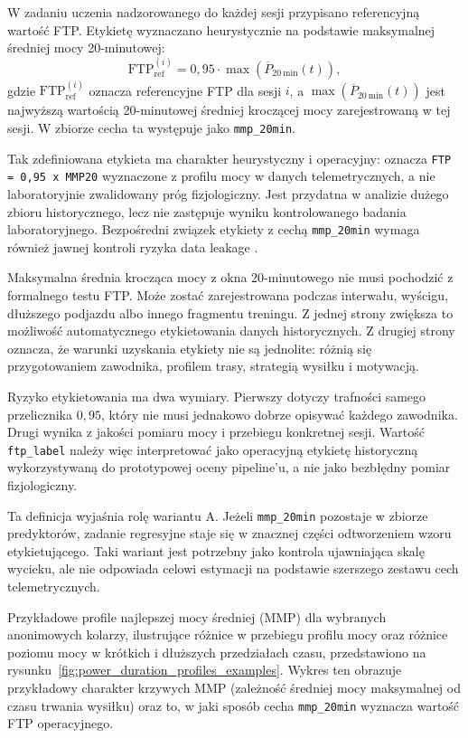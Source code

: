 W zadaniu uczenia nadzorowanego do każdej sesji przypisano referencyjną wartość FTP. Etykietę wyznaczano heurystycznie na podstawie maksymalnej średniej mocy 20-minutowej:
\begin{equation}
\label{eq:ftp_ref_mmp20_metodologia}
\mathrm{FTP}_{\mathrm{ref}}^{(i)} = 0{,}95 \cdot \max\!\left(\overline{P}_{20\ \mathrm{min}}(t)\right),
\end{equation}
gdzie $\mathrm{FTP}_{\mathrm{ref}}^{(i)}$ oznacza referencyjne FTP dla sesji $i$, a $\max(\overline{P}_{20\ \mathrm{min}}(t))$ jest najwyższą wartością 20-minutowej średniej kroczącej mocy zarejestrowaną w tej sesji. W zbiorze cecha ta występuje jako \texttt{mmp\_20min}.

Tak zdefiniowana etykieta ma charakter heurystyczny i operacyjny: oznacza \texttt{FTP = 0{,}95 x MMP20} wyznaczone z profilu mocy w danych telemetrycznych, a nie laboratoryjnie zwalidowany próg fizjologiczny. Jest przydatna w analizie dużego zbioru historycznego, lecz nie zastępuje wyniku kontrolowanego badania laboratoryjnego. Bezpośredni związek etykiety z cechą \texttt{mmp\_20min} wymaga również jawnej kontroli ryzyka data leakage \parencite{kaufman2012leakage,bernett2024leakage}.

Maksymalna średnia krocząca mocy z okna 20-minutowego nie musi pochodzić z formalnego testu FTP. Może zostać zarejestrowana podczas interwału, wyścigu, dłuższego podjazdu albo innego fragmentu treningu. Z jednej strony zwiększa to możliwość automatycznego etykietowania danych historycznych. Z drugiej strony oznacza, że warunki uzyskania etykiety nie są jednolite: różnią się przygotowaniem zawodnika, profilem trasy, strategią wysiłku i motywacją.

Ryzyko etykietowania ma dwa wymiary. Pierwszy dotyczy trafności samego przelicznika $0{,}95$, który nie musi jednakowo dobrze opisywać każdego zawodnika. Drugi wynika z jakości pomiaru mocy i przebiegu konkretnej sesji. Wartość \texttt{ftp\_label} należy więc interpretować jako operacyjną etykietę historyczną wykorzystywaną do prototypowej oceny pipeline'u, a nie jako bezbłędny pomiar fizjologiczny.

Ta definicja wyjaśnia rolę wariantu A. Jeżeli \texttt{mmp\_20min} pozostaje w zbiorze predyktorów, zadanie regresyjne staje się w znacznej części odtworzeniem wzoru etykietującego. Taki wariant jest potrzebny jako kontrola ujawniająca skalę wycieku, ale nie odpowiada celowi estymacji na podstawie szerszego zestawu cech telemetrycznych.

Przykładowe profile najlepszej mocy średniej (MMP) dla wybranych anonimowych kolarzy, ilustrujące różnice w przebiegu profilu mocy oraz różnice poziomu mocy w krótkich i dłuższych przedziałach czasu, przedstawiono na rysunku~\ref{fig:power_duration_profiles_examples}. Wykres ten obrazuje przykładowy charakter krzywych MMP (zależność średniej mocy maksymalnej od czasu trwania wysiłku) oraz to, w jaki sposób cecha \texttt{mmp\_20min} wyznacza wartość FTP operacyjnego.

